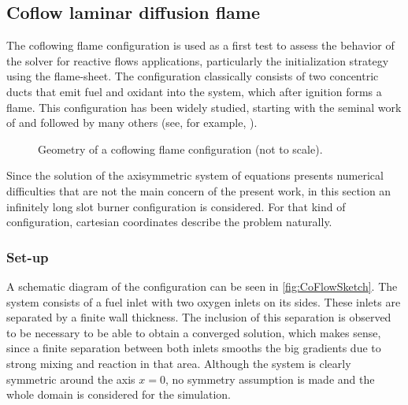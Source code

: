 \subsection{Coflow laminar diffusion flame}\label{ssec:coflowFlame}
The coflowing flame configuration is used as a first test to assess the behavior of the solver for reactive flows applications, particularly the initialization strategy using the flame-sheet. The configuration classically consists of two concentric ducts that emit fuel and oxidant into the system, which after ignition forms a flame. This configuration has been widely studied, starting with the seminal work of \textcite{burkeDiffusionFlames1928} and followed by many others (see, for example, \textcite{smookeNumericalModelingAxisymmetric1992, smookeNumericalSolutionTwoDimensional1986,braackAdaptiveFiniteElement1997}).
\begin{figure}[t]
	\centering
	\def\svgwidth{0.38\textwidth}
	\qquad\quad
	\def\svgwidth{0.35\textwidth}
	\caption{Geometry of a coflowing flame configuration (not to scale).} \label{fig:CoFlowGeometry}
\end{figure}
Since the solution of the axisymmetric system of equations presents numerical difficulties that are not the main concern of the present work, in this section an infinitely long slot burner configuration is considered. For that kind of configuration, cartesian coordinates describe the problem naturally. 
\subsubsection{Set-up}
A schematic diagram of the configuration can be seen in \cref{fig:CoFlowSketch}. The system consists of a fuel inlet with two oxygen inlets on its sides. These inlets are separated by a finite wall thickness. The inclusion of this separation is observed to be necessary to be able to obtain a converged solution, which makes sense, since a finite separation between both inlets smooths the big gradients due to strong mixing and reaction in that area. Although the system is clearly symmetric around the axis $x = 0$, no symmetry assumption is made and the whole domain is considered for the simulation.


